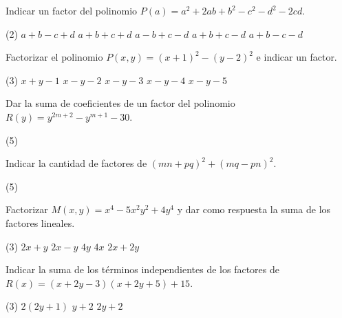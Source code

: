 \begin{multicols}{2}
    \begin{exercise}
        Indicar un factor del polinomio $P(a) = a^2 + 2ab + b^2 - c^2 - d^2 - 2cd$.
        \begin{tasks}(2)
            \task $a + b - c + d$
            \task $a + b + c + d$
            \task $a - b + c - d$
            \task $a + b + c - d$
            \task $a + b - c - d$
        \end{tasks}
    \end{exercise}

    \begin{exercise}
        Factorizar el polinomio $P(x, y) = (x + 1)^2 - (y - 2)^2$ e indicar un factor.
        \begin{tasks}(3)
            \task $x + y - 1$
            \task $x - y - 2$
            \task $x - y - 3$
            \task $x - y - 4$
            \task $x - y - 5$
        \end{tasks}
    \end{exercise}

    \begin{exercise}
        Dar la suma de coeficientes de un factor del polinomio $R(y) = y^{2m + 2} - y^{m + 1} - 30$.
        \begin{tasks}(5)
        \end{tasks}
    \end{exercise}
    
    \begin{exercise}
        Indicar la cantidad de factores de $(mn + pq)^2 + (mq - pn)^2$.
        \begin{tasks}(5)
        \end{tasks}
    \end{exercise}

    \begin{exercise}
        Factorizar $M(x,y) = x^4 - 5x^2 y^2 + 4y^4$ y dar como respuesta la suma de los factores lineales.
        \begin{tasks}(3)
            \task $2x + y$
            \task $2x - y$
            \task $4y$
            \task $4x$
            \task $2x + 2y$
        \end{tasks}
    \end{exercise}

    \begin{exercise}
        Indicar la suma de los términos independientes de los factores de $R(x) = (x + 2y - 3)(x + 2y + 5) + 15$.
        \begin{tasks}(3)
            \task $2(2y + 1)$
            \task $y + 2$
            \task $2y + 2$
        \end{tasks}
    \end{exercise}


\end{multicols}
